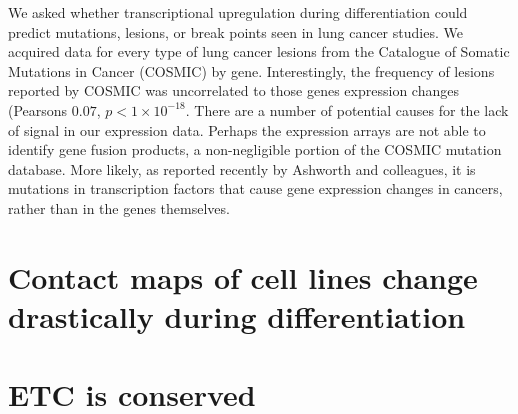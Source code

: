 We asked whether transcriptional upregulation during differentiation could predict mutations, lesions, or break points seen in lung
cancer studies.  We acquired data for every type of lung cancer lesions from the Catalogue of Somatic Mutations in Cancer
(COSMIC)\cite{forbes2009} by gene.  Interestingly, the frequency of lesions reported by COSMIC was uncorrelated to those genes
expression changes (Pearsons $0.07$, $p < 1 \times 10^{-18}$.  There are a number of potential causes for the lack of signal in
our expression data.  Perhaps the expression arrays are not able to identify gene fusion products, a non-negligible portion of
the COSMIC mutation database.  More likely, as reported recently by Ashworth and colleagues, it is mutations in transcription factors
that cause gene expression changes in cancers, rather than in the genes themselves\cite{ashworth2014}.

\section*{Contact maps of cell lines change drastically during differentiation}

\section*{ETC is conserved}


